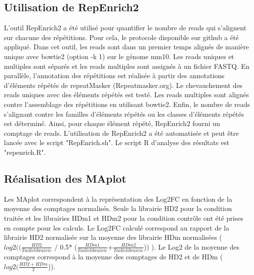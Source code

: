 \documentclass[a4paper,12pt,times]{report}
\begin{document}
    \subsection{Utilisation de RepEnrich2}
    L'outil RepEnrich2 \cite{pmid25012247} a été utilisé pour quantifier le nombre de reads qui s'alignent sur chacune des répétitions. Pour cela, le protocole disponible sur github \cite{protocole} a été appliqué.
    Dans cet outil, les reads sont dans un premier temps alignés de manière unique avec bowtie2 (option -k 1) sur le génome mm10. Les reads uniques et multiples sont séparés et les reads multiples sont assignés à un fichier FASTQ.
    En parallèle, l'annotation des répétitions est réalisée à partir des annotations d'éléments répétés de repeatMasker (Repeatmasker.org). 
    Le chevauchement des reads uniques avec des éléments répétés est testé. Les reads multiples sont alignés contre l'assemblage des répétitions en utilisant bowtie2.
    Enfin, le nombre de reads s'alignant contre les familles d'éléments répétés ou les classes d'éléments répétés est déterminé. Ainsi, pour chaque élément répété, RepEnrich2 fourni un comptage de reads.
 \newline
 L'utilisation de RepEnrich2 a été automatisée et peut être lancée avec le script "RepEnrich.sh".
 Le script R d'analyse des résultats est "repenrich.R".
 
    

    \subsection{Réalisation des MAplot}
    Les MAplot correspondent à la représentation des Log2FC en fonction de la moyenne des comptages normalisés.
Seule la librairie HD2 pour la condition traitée et les librairies HDm1 et HDm2 pour la condition contrôle ont été prises en compte pour les calculs.
   Le Log2FC calculé correspond au rapport de la librairie HD2 normalisée sur la moyenne des librairie HDm normalisées 
(
 $log2((\frac{HD2}{Taille librairie}$ / 0.5* ($\frac{HDm1}{Taille librairie}$+$\frac{HDm2}{Taille librairie}$)) ).     
 \newline
Le Log2 de la moyenne des comptages correspond à la moyenne des comptages de HD2 et de HDm ($log2(\frac{HD2+HDm}{2}$)).
          
\end{document}
